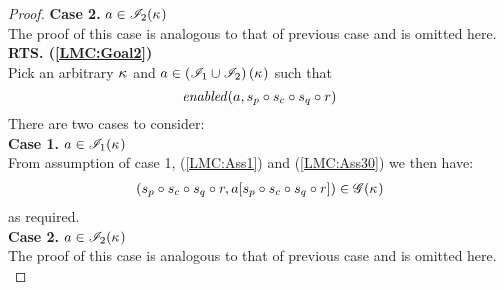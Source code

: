 \begin{lemma}
\begin{proof}
\noindent\textbf{Case 2.} $a \in \mathscr{I}_{2}(\kappa_{})$\\
The proof of this case is analogous to that of previous case and is omitted here.\\
%
%
%
%
%




\noindent\textbf{RTS. (\ref{LMC:Goal2})}\\
Pick an arbitrary $\kappa_{}$ and $a \in \left(\mathscr{I}_{1} \cup \mathscr{I}_{2} \right)(\kappa_{})$ such that
\begin{equation}
	\mathit{enabled}(a, s_p \circ s_c \circ s_q \circ r) \label{LMC:Ass30}
\end{equation}
%
There are two cases to consider:\\

\noindent\textbf{Case 1.} $a \in \mathscr{I}_{1}(\kappa_{})$\\
From assumption of case 1, (\ref{LMC:Ass1}) and (\ref{LMC:Ass30}) we then have: 
%
\begin{align*}
	(s_p \circ s_c \circ s_q \circ r, a[s_p \circ s_c \circ s_q \circ r]) \in \mathscr{G}(\kappa_{})
\end{align*}
%
as required. \\

\noindent\textbf{Case 2.} $a \in \mathscr{I}_{2}(\kappa_{})$\\
The proof of this case is analogous to that of previous case and is omitted here.\\
%
%
%
%
%


\end{proof}
\end{lemma}
